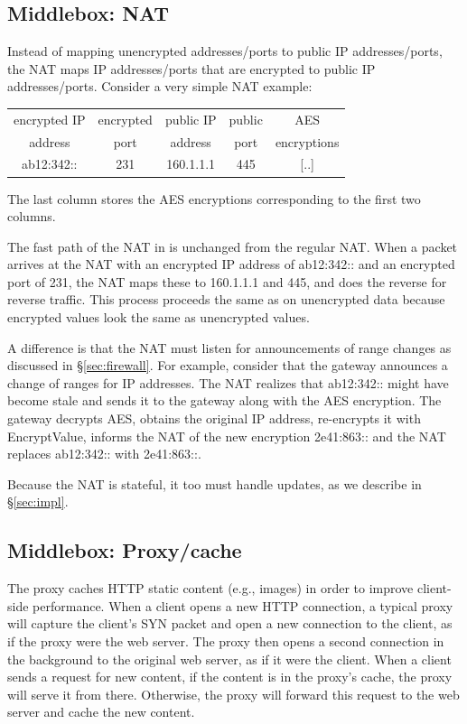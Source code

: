 \subsection{Middlebox: NAT}\label{sec:nat}



Instead of mapping unencrypted addresses/ports to public IP addresses/ports, the NAT maps IP addresses/ports that are encrypted to public IP addresses/ports. 
Consider a very simple NAT example:

\smallskip
\small
\noindent
\begin{tabular}{c|c|c|c|c}
encrypted IP   & encrypted  &  public IP   & public  &  AES   \\
address           & port            &   address   &  port    & encryptions \\
\hline
ab12:342::               & 231                  & 160.1.1.1  &  445 &  [..] \\ 
\end{tabular}
\normalsize
\smallskip

The last column stores the AES encryptions corresponding to the first two columns. 

The fast path of the NAT in \sys{} is unchanged from the regular NAT. 
When a packet arrives at the NAT with an encrypted   IP address of ab12:342:: and an encrypted port of 231, the NAT maps these to 160.1.1.1 and 445, and does the reverse for reverse traffic. 
This process proceeds the same as on unencrypted data because encrypted values look the same as unencrypted values. 


A difference is that the NAT must listen for announcements of range changes as discussed in \S\ref{sec:firewall}.
For example, consider that the gateway announces a change of ranges for IP addresses.
The NAT realizes that ab12:342:: might have become stale and sends it to the gateway along with the AES encryption. The gateway decrypts AES, obtains the original IP address, re-encrypts it with EncryptValue, informs the NAT of the new encryption 2e41:863:: and the NAT replaces  ab12:342:: with 2e41:863::.

Because the NAT is stateful, it too must handle updates, as we describe in \S\ref{sec:impl}.

\subsection{Middlebox: Proxy/cache}\label{s:proxy}

The proxy  caches HTTP static content (e.g., images) in order to improve client-side performance. 
When a client opens a new HTTP connection, a typical proxy will capture the client's SYN packet and open a new connection to the client, as if the proxy were the web server. The proxy then opens a second connection in the background to the original web server, as if it were the client. 
When a client sends a request for new content, if the content is in the proxy's cache, the proxy will serve it from there. Otherwise, the proxy will forward this request to the web server and cache the new content. 


